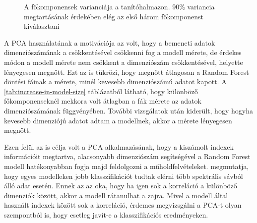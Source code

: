 \varianceretention

\begin{figure}
    \caption{A főkomponensek varianciája a tanítóhalmazon. 90\% variancia megtartásának érdekében elég az első három főkomponenst kiválasztani}
    \label{fig:pca-variance}
\end{figure}

A PCA használatának a motivációja az volt, hogy a bemeneti adatok dimenziószámának a csökkentésével csökkenni fog a modell mérete, de érdekes módon a modell mérete nem csökkent a dimenziószám csökkentésével, helyette lényegesen megnőtt. Ezt az is tükrözi, hogy megnőtt átlagosan a Random Forest döntési fáinak a mérete, minél kevesebb dimenziószámú adatot kapott. A \ref{tab:increase-in-model-size} táblázatból látható, hogy különböző főkomponenseknél mekkora volt átlagban a fák mérete az adatok dimenziószámának függvényében. További vizsgálatok után kiderült, hogy hogyha kevesebb dimenziójú adatot adtam a modellnek, akkor a mérete lényegesen megnőtt. 

Ezen felül az is célja volt a PCA alkalmazásának, hogy a kiszámolt indexek információit megtartva, alacsonyabb dimenziószám segítségével a Random Forest modell hatékonyabban fogja majd feldolgozni a műholdfelvételeket. \cite{Howley2005} megmutatja, hogy egyes modelleken jobb klasszifikációt tudtak elérni több spektrális sávból álló adat esetén. Ennek az az oka, hogy ha igen sok a korreláció a különböző dimenziók között, akkor a modell rátanulhat a zajra. Mivel a modell által használt indexek között sok a korreláció, érdemes megvizsgálni a PCA-t olyan szempontból is, hogy esetleg javít-e a klasszifikációs eredményeken. 

